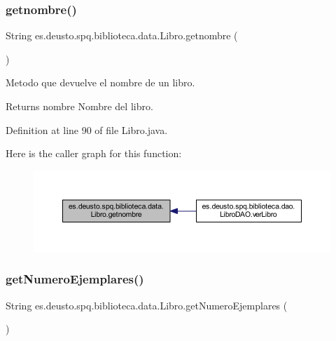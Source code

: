 \subsubsection{\texorpdfstring{getnombre()}{getnombre()}}
{\footnotesize\ttfamily String es.\+deusto.\+spq.\+biblioteca.\+data.\+Libro.\+getnombre (\begin{DoxyParamCaption}{ }\end{DoxyParamCaption})}

Metodo que devuelve el nombre de un libro. \begin{DoxyReturn}{Returns}
nombre Nombre del libro. 
\end{DoxyReturn}


Definition at line 90 of file Libro.\+java.

Here is the caller graph for this function\+:
\nopagebreak
\begin{figure}[H]
\begin{center}
\leavevmode
\includegraphics[width=350pt]{classes_1_1deusto_1_1spq_1_1biblioteca_1_1data_1_1_libro_a9e03d89691d2549ee6702b801ad09e32_icgraph}
\end{center}
\end{figure}
\mbox{\label{classes_1_1deusto_1_1spq_1_1biblioteca_1_1data_1_1_libro_af9baf7646d6122ef4841b6a1672a4306}} 
\subsubsection{\texorpdfstring{get\+Numero\+Ejemplares()}{getNumeroEjemplares()}}
{\footnotesize\ttfamily String es.\+deusto.\+spq.\+biblioteca.\+data.\+Libro.\+get\+Numero\+Ejemplares (\begin{DoxyParamCaption}{ }\end{DoxyParamCaption})}

